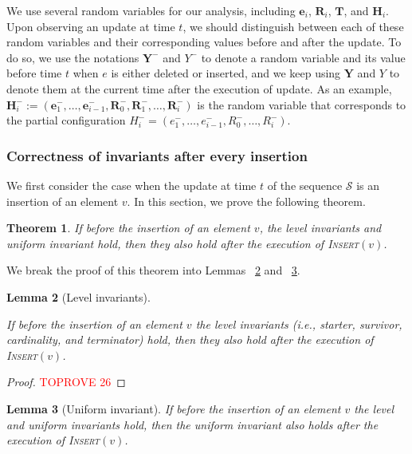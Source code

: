 \documentclass[11pt]{article}
\newtheorem{theorem}{Theorem}
\newtheorem{lemma}[theorem]{Lemma}
\newcommand{\insertv}{{\textsc{Insert}}}
\newcommand{\bR}{\ensuremath{\mathbf{R}}}
\newcommand{\bE}{\ensuremath{\mathbf{e}}}
\newcommand{\bT}{\ensuremath{\mathbf{T}}}
\newcommand{\bH}{\ensuremath{\mathbf{H}}}
\newcommand{\bY}{\ensuremath{\mathbf{Y}}}
\begin{document}
We use several random variables for our analysis, including $\bE_i$, $\bR_i$, $\bT$, and $\bH_i$. Upon observing an update at time $t$, 
we should distinguish between each of these random variables and their corresponding values before and after the update.
To do so, we use the notations $\bY^-$ and $Y^{-}$ to denote a random variable and its value before time $t$ when $e$ is either deleted or inserted, and we keep using $\bY$ and $Y$ to denote them at the current time after the execution of update.
As an example,
    $\bH_i^- := (\bE_1^-, \dots, \bE_{i-1}^-, \bR_0^-,  \bR_{1}^-, \dots, \bR_{i}^-)$ 
    is the random variable that corresponds to the partial configuration $H_i^- = (e_1^-, \dots, e_{i-1}^-, R_0^-, \dots, R_{i}^-)$.


\subsubsection{Correctness of invariants after every insertion}

We first consider the case when the update at time $t$ of the sequence $\mathcal{S}$ is an insertion of an element $v$. 
In this section, we prove the following theorem. 


\begin{theorem}
\label{cardinality:mat_insert:invariants}
If before the insertion of an element $v$, the level invariants and uniform invariant hold, then they also hold after the execution of \insertv$(v)$. 
\end{theorem}

We break the proof of this theorem into Lemmas ~\ref{cardinality:mat_insert_level} and ~\ref{cardinality:mat_insert_uni}.


\begin{lemma} [Level invariants]
\label{cardinality:mat_insert_level}

If before the insertion of an element $v$ the level invariants (i.e., starter, survivor, cardinality, and terminator) hold, 
then they also hold after the execution of \insertv$(v)$. 
\end{lemma}

\begin{proof}\textcolor{red}{TOPROVE 26}\end{proof}



\begin{lemma} [Uniform invariant]
\label{cardinality:mat_insert_uni}
If before the insertion of an element $v$ the level and uniform invariants hold, then the uniform invariant also holds after the execution of \insertv$(v)$. 
\end{lemma}
\end{document}
